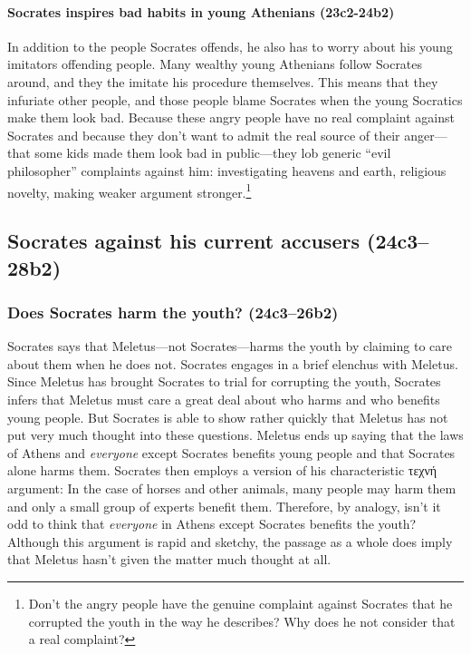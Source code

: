 \documentclass[11pt]{article}
\begin{document}

\paragraph{Socrates inspires bad habits in young Athenians (23c2-24b2)}

In addition to the people Socrates offends, he also has to worry about his young imitators offending people.  Many wealthy young Athenians follow Socrates around, and they the imitate his procedure themselves. This means that they infuriate other people, and those people blame Socrates when the young Socratics make them look bad.  Because these angry people have no real complaint against Socrates and because they don't want to admit the real source of their anger---that some kids made them look bad in public---they lob generic ``evil philosopher'' complaints against him: investigating heavens and earth, religious novelty, making weaker argument stronger.\footnote{Don't the angry people have the genuine complaint against Socrates that he corrupted the youth in the way he describes? Why does he not consider that a real complaint?}




\subsection{Socrates against his current accusers (24c3--28b2)}

\subsubsection{Does Socrates harm the youth? (24c3--26b2)}

Socrates says that Meletus---not Socrates---harms the youth by claiming to care about them when he does not. Socrates engages in a brief elenchus with Meletus.  Since Meletus has brought Socrates to trial for corrupting the youth, Socrates infers that Meletus must care a great deal about who harms and who benefits young people. But Socrates is able to show rather quickly that Meletus has not put very much thought into these questions.  Meletus ends up saying that the laws of Athens and \emph{everyone} except Socrates benefits young people and that Socrates alone harms them.  Socrates then employs a version of his characteristic {\g τεχνή} argument: In the case of horses and other animals, many people may harm them and only a small group of experts benefit them.  Therefore, by analogy, isn't it odd to think that \emph{everyone} in Athens except Socrates benefits the youth?  Although this argument is rapid and sketchy, the passage as a whole does imply that Meletus hasn't given the matter much thought at all.
\end{document}
